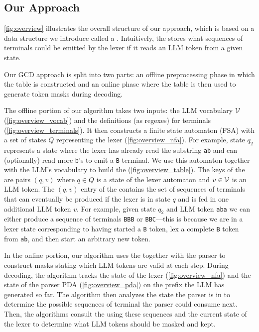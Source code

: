 \subsection{Our Approach}
\label{sec:our-approach}

\autoref{fig:overview} illustrates the overall structure of our approach, which is based on a data structure we introduce called a \textit{\table}. Intuitively, the \table stores what sequences of terminals could be emitted by the lexer if it reads an LLM token from a given state.

Our GCD approach is split into two parts: an offline preprocessing phase in which the table is constructed and an online phase where the table is then used to generate token masks during decoding.

The offline portion of our algorithm takes two inputs: the LLM vocabulary $\mathcal{V}$ (\autoref{fig:overview_vocab}) and the definitions (as regexes) for terminals (\autoref{fig:overview_terminals}).
It then constructs a finite state automaton (FSA) with a set of states $Q$ representing the lexer (\autoref{fig:overview_nfa}).
For example, state $q_2$ represents a state where the lexer has already read the substring \texttt{ab} and can (optionally) read more \texttt{b}'s to emit a \texttt{B} terminal.
We use this automaton together with the LLM's vocabulary to build the \table (\autoref{fig:overview_table}).
The keys of the \table are pairs $(q, v)$ where $q \in Q$ is a state of the lexer automaton and $v \in \mathcal{V}$ is an LLM token.
The $(q, v)$ entry of the \table contains the set of sequences of terminals that can eventually be produced if the lexer is in state $q$ and is fed in one additional LLM token $v$. 
For example, given state $q_2$ and LLM token \texttt{aba} we can either produce a sequence of terminals \texttt{BBB} or \texttt{BBC}---this is because we are in a lexer state corresponding to having started a \texttt{B} token, lex a complete \texttt{B} token from \texttt{ab}, and then start an arbitrary new token.

In the online portion, our algorithm uses the \table together with the parser to construct masks stating which LLM tokens are valid at each step. During decoding, the algorithm tracks the state of the lexer (\autoref{fig:overview_nfa}) and the state of the parser PDA (\autoref{fig:overview_pda}) on the prefix the LLM has generated so far. The algorithm then analyzes the state the parser is in to determine the possible sequences of terminal the parser could consume next. Then, the algorithms consult the \table using these sequences and the current state of the lexer to determine what LLM tokens should be masked and kept.

